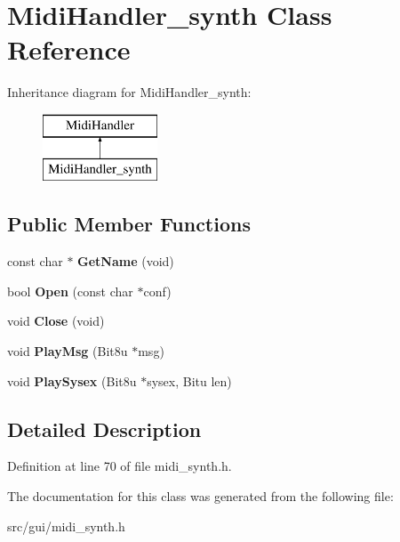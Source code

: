 \hypertarget{classMidiHandler__synth}{\section{Midi\-Handler\-\_\-synth Class Reference}
\label{classMidiHandler__synth}
}
Inheritance diagram for Midi\-Handler\-\_\-synth\-:\begin{figure}[H]
\begin{center}
\leavevmode
\includegraphics[height=2.000000cm]{classMidiHandler__synth}
\end{center}
\end{figure}
\subsection*{Public Member Functions}
\begin{DoxyCompactItemize}
\item 
\hypertarget{classMidiHandler__synth_a454a33652eaf4a99349caf378de56de0}{const char $\ast$ {\bfseries Get\-Name} (void)}\label{classMidiHandler__synth_a454a33652eaf4a99349caf378de56de0}

\item 
\hypertarget{classMidiHandler__synth_a026ce32cbfcb35586e6e6319a375f9ae}{bool {\bfseries Open} (const char $\ast$conf)}\label{classMidiHandler__synth_a026ce32cbfcb35586e6e6319a375f9ae}

\item 
\hypertarget{classMidiHandler__synth_ab73be86b44941f696b08a8eb2a4528e8}{void {\bfseries Close} (void)}\label{classMidiHandler__synth_ab73be86b44941f696b08a8eb2a4528e8}

\item 
\hypertarget{classMidiHandler__synth_afd4de648ae2becfbda22248e30856634}{void {\bfseries Play\-Msg} (Bit8u $\ast$msg)}\label{classMidiHandler__synth_afd4de648ae2becfbda22248e30856634}

\item 
\hypertarget{classMidiHandler__synth_a9f912eb5d21109f9b42c8a4b70d0544f}{void {\bfseries Play\-Sysex} (Bit8u $\ast$sysex, Bitu len)}\label{classMidiHandler__synth_a9f912eb5d21109f9b42c8a4b70d0544f}

\end{DoxyCompactItemize}


\subsection{Detailed Description}


Definition at line 70 of file midi\-\_\-synth.\-h.



The documentation for this class was generated from the following file\-:\begin{DoxyCompactItemize}
\item 
src/gui/midi\-\_\-synth.\-h\end{DoxyCompactItemize}
